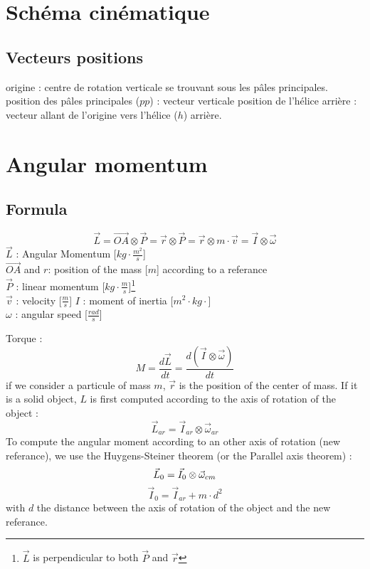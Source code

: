 \documentclass[12pt,a4paper]{article}
\begin{document}
\newpage
\section{Schéma cinématique}


\subsection{Vecteurs positions}
origine : centre de rotation verticale se trouvant sous les pâles principales.
\medbreak
position  des pâles principales ($pp$) : vecteur verticale
\medbreak
position de l'hélice arrière : 
vecteur allant de l'origine vers l'hélice ($h$) arrière. 


\newpage
\section{Angular momentum}

\subsection{Formula}
\begin{equation}
\vec{L}=\vec{OA} \otimes \vec{P}=\vec{r} \otimes \vec{P}=\vec{r} \otimes m \cdot \vec{v}=\vec{I} \otimes \vec{\omega}
\end{equation}
$\vec{L}$ : Angular Momentum [$kg \cdot \frac{m^2}{s}$]\\
$\vec{OA}$ and $r$: position of the mass [$m$] according to a referance\\
$\vec{P}$ : linear momentum [$kg\cdot \frac{m}{s}$]\footnote{$\vec{L}$ is perpendicular to both $\vec{P}$ and $\vec{r}$}\\
$\vec{v}$ : velocity [$\frac{m}{s}$]
$I$ : moment of inertia [$m^2 \cdot kg \cdot$]\\
$\omega$ : angular speed [$\frac{rad}{s}$]

Torque : 
\begin{equation}
M = \frac{d\vec{L}}{dt}=\frac{d(\vec{I} \otimes \vec{\omega})}{dt}
\end{equation}
\medbreak
if we consider a particule of mass $m$, $\vec{r}$ is the position of the center of mass.
If it is a solid object, $L$ is first computed according to the axis of rotation of the object : 
\begin{equation}
\vec{L}_{ar}=\vec{I}_{ar} \otimes \vec{\omega}_{ar}
\end{equation}
To compute the angular moment according to an other axis of rotation (new referance), we use the Huygens-Steiner theorem (or the Parallel axis theorem) : 
\begin{equation}
\vec{L}_{0}=\vec{I}_{0} \otimes \vec{\omega}_{cm}\\
\end{equation}
\begin{equation}
\vec{I}_{0} = \vec{I}_{ar} + m\cdot d^2
\end{equation}
with $d$ the distance between the axis of rotation of the object and the new referance. 
\end{document}
